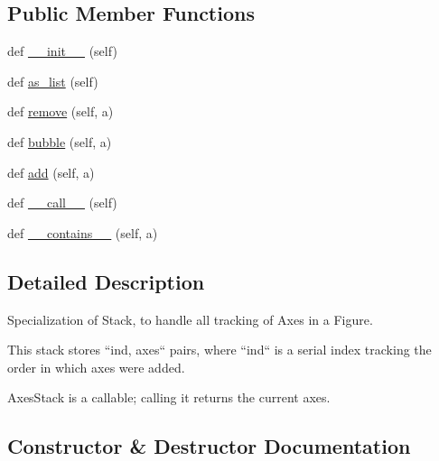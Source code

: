 \subsection*{Public Member Functions}
\begin{DoxyCompactItemize}
\item 
def \hyperlink{classmatplotlib_1_1figure_1_1__AxesStack_a75d6ed84165737e038a42f4e9afdfdd9}{\+\_\+\+\_\+init\+\_\+\+\_\+} (self)
\item 
def \hyperlink{classmatplotlib_1_1figure_1_1__AxesStack_a49363361c2f7d876e6b9d54951804c21}{as\+\_\+list} (self)
\item 
def \hyperlink{classmatplotlib_1_1figure_1_1__AxesStack_a0ac61e4385f21e846d645cd61b9be273}{remove} (self, a)
\item 
def \hyperlink{classmatplotlib_1_1figure_1_1__AxesStack_a8fda07b52c3972eeb74a9debb6b3970d}{bubble} (self, a)
\item 
def \hyperlink{classmatplotlib_1_1figure_1_1__AxesStack_ae1d6a33592ea671daf55189c7b61a842}{add} (self, a)
\item 
def \hyperlink{classmatplotlib_1_1figure_1_1__AxesStack_aa76c05eccdd837d39d9afb2dbe33ae9f}{\+\_\+\+\_\+call\+\_\+\+\_\+} (self)
\item 
def \hyperlink{classmatplotlib_1_1figure_1_1__AxesStack_a8b442b6c87733bbd77f22664c8cd0967}{\+\_\+\+\_\+contains\+\_\+\+\_\+} (self, a)
\end{DoxyCompactItemize}


\subsection{Detailed Description}
\begin{DoxyVerb}Specialization of Stack, to handle all tracking of Axes in a Figure.

This stack stores ``ind, axes`` pairs, where ``ind`` is a serial index
tracking the order in which axes were added.

AxesStack is a callable; calling it returns the current axes.
\end{DoxyVerb}
 

\subsection{Constructor \& Destructor Documentation}
\mbox{\label{classmatplotlib_1_1figure_1_1__AxesStack_a75d6ed84165737e038a42f4e9afdfdd9}} 
